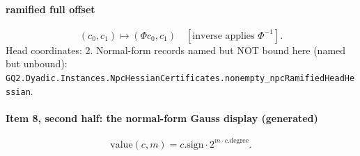 \paragraph{ramified full offset}
\[(c_0,c_1)\mapsto(\Phi c_0,c_1)\quad[\text{inverse applies }\Phi^{-1}].\]
Head coordinates: 2. Normal-form records named but NOT bound here (named but unbound): \texttt{GQ2.Dyadic.Instances.NpcHessianCertificates.nonempty\_npcRamifiedHeadHessian}.
\paragraph{Item 8, second half: the normal-form Gauss display (generated)}
\[\mathrm{value}(c,m)=c.\mathrm{sign}\cdot 2^{m\cdot c.\mathrm{degree}}.\]
